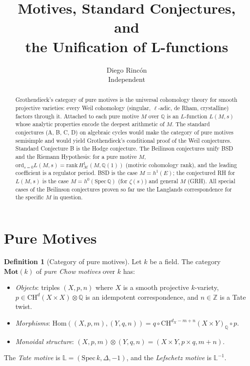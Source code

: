 \documentclass[12pt]{article}
\title{Motives, Standard Conjectures, and\\
the Unification of L-functions}
\author{Diego Rinc\'on\\
\small Independent}
\date{}
\theoremstyle{definition}
\newtheorem{definition}[theorem]{Definition}
\theoremstyle{remark}
\begin{document}
\maketitle

\begin{abstract}
Grothendieck's category of pure motives is the universal cohomology theory for
smooth projective varieties: every Weil cohomology (singular, $\ell$-adic, de Rham,
crystalline) factors through it. Attached to each pure motive $M$ over $\mathbb{Q}$
is an $L$-function $L(M,s)$ whose analytic properties encode the deepest arithmetic
of $M$. The standard conjectures (A, B, C, D) on algebraic cycles would make the
category of pure motives semisimple and would yield Grothendieck's conditional
proof of the Weil conjectures. Standard Conjecture B is the Hodge conjecture.
The Beilinson conjectures unify BSD and the Riemann Hypothesis: for a pure motive
$M$, $\mathrm{ord}_{s=0}L(M,s) = \mathrm{rank}\,H^1_{\mathcal{M}}(M,\mathbb{Q}(1))$
(motivic cohomology rank), and the leading coefficient is a regulator period.
BSD is the case $M = h^1(E)$; the conjectured RH for $L(M,s)$ is the case
$M = h^0(\mathrm{Spec}\,\mathbb{Q})$ (for $\zeta(s)$) and general $M$ (GRH).
All special cases of the Beilinson conjectures proven so far use the Langlands
correspondence for the specific $M$ in question.
\end{abstract}

\section{Pure Motives}

\begin{definition}[Category of pure motives]
Let $k$ be a field. The category $\mathbf{Mot}(k)$ of \emph{pure Chow motives}
over $k$ has:
\begin{itemize}
\item \emph{Objects}: triples $(X, p, n)$ where $X$ is a smooth projective
  $k$-variety, $p\in \mathrm{CH}^d(X\times X)\otimes\mathbb{Q}$ is an idempotent
  correspondence, and $n\in\mathbb{Z}$ is a Tate twist.
\item \emph{Morphisms}: $\mathrm{Hom}((X,p,m),(Y,q,n)) =
  q\circ\mathrm{CH}^{d_X-m+n}(X\times Y)_\mathbb{Q}\circ p$.
\item \emph{Monoidal structure}: $(X,p,m)\otimes(Y,q,n) = (X\times Y, p\times q, m+n)$.
\end{itemize}
The \emph{Tate motive} is $\mathbb{L} = (\mathrm{Spec}\,k, \Delta, -1)$,
and the \emph{Lefschetz motive} is $\mathbb{L}^{-1}$.
\end{definition}
\end{document}
